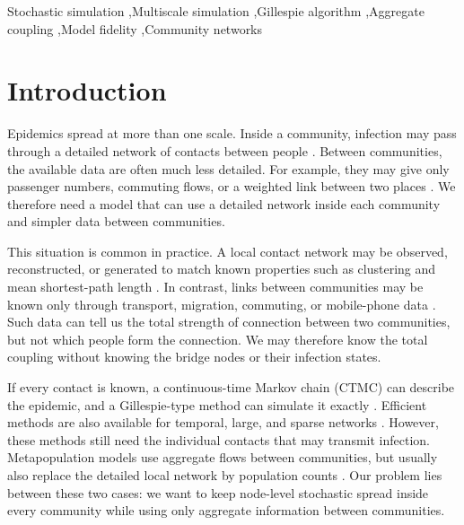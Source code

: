 \documentclass[a4paper,fleqn]{cas-sc}
\begin{document}
\begin{keywords}
Stochastic simulation \sep Multiscale simulation \sep Gillespie algorithm \sep Aggregate coupling \sep Model fidelity \sep Community networks
\end{keywords}

\maketitle

\begingroup\color{red}
\hypersetup{citecolor=red,linkcolor=red}

\section{Introduction}
\label{sec:introduction}

Epidemics spread at more than one scale. Inside a community, infection may pass through a detailed network of contacts between people \citep{keeling2005,pastorsatorras2015,kiss2017}. Between communities, the available data are often much less detailed. For example, they may give only passenger numbers, commuting flows, or a weighted link between two places \citep{balcan2009,barbosa2018human}. We therefore need a model that can use a detailed network inside each community and simpler data between communities.

This situation is common in practice. A local contact network may be observed, reconstructed, or generated to match known properties such as clustering and mean shortest-path length \citep{eubank2004,danon2011}. In contrast, links between communities may be known only through transport, migration, commuting, or mobile-phone data \citep{barbosa2018human,chang2021}. Such data can tell us the total strength of connection between two communities, but not which people form the connection. We may therefore know the total coupling without knowing the bridge nodes or their infection states.

If every contact is known, a continuous-time Markov chain (CTMC) can describe the epidemic, and a Gillespie-type method can simulate it exactly \citep{gillespie1977exact,gibson2000}. Efficient methods are also available for temporal, large, and sparse networks \citep{vestergaard2015,kuryliak2025simulating}. However, these methods still need the individual contacts that may transmit infection. Metapopulation models use aggregate flows between communities, but usually also replace the detailed local network by population counts \citep{colizza2007reaction,colizza2008,balcan2010modeling,ajelli2010}. Our problem lies between these two cases: we want to keep node-level stochastic spread inside every community while using only aggregate information between communities.
\end{document}
